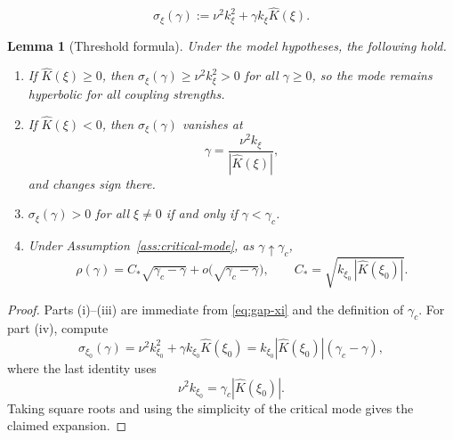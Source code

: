 \documentclass[10pt,a4paper]{amsart}
\newtheorem{lemma}{Lemma}
\newcommand{\Kh}{\widehat{K}}
\newcommand{\gamc}{\gamma_c}
\begin{document}
\begin{equation}
\label{eq:gap-xi}
\sigma_\xi(\gamma) := \nu^2 k_\xi^2+\gamma k_\xi \Kh(\xi).
\end{equation}

\begin{lemma}[Threshold formula]
\label{lem:threshold}
Under the model hypotheses, the following hold.
\begin{enumerate}[label=\textup{(\roman*)},leftmargin=2em]
\item If $\Kh(\xi)\ge 0$, then $\sigma_\xi(\gamma)\ge \nu^2k_\xi^2>0$ for all $\gamma\ge 0$,
so the mode remains hyperbolic for all coupling strengths.
\item If $\Kh(\xi)<0$, then $\sigma_\xi(\gamma)$ vanishes at
\[
\gamma=\frac{\nu^2k_\xi}{|\Kh(\xi)|},
\]
and changes sign there.
\item $\sigma_\xi(\gamma)>0$ for all $\xi\neq 0$ if and only if $\gamma<\gamc$.
\item Under Assumption~\ref{ass:critical-mode}, as $\gamma\uparrow\gamc$,
\[
\rho(\gamma) = C_\ast\sqrt{\gamc-\gamma}+o\!\bigl(\sqrt{\gamc-\gamma}\bigr),
\qquad
C_\ast = \sqrt{k_{\xi_0}\,|\Kh(\xi_0)|}.
\]
\end{enumerate}
\end{lemma}

\begin{proof}
Parts (i)--(iii) are immediate from \eqref{eq:gap-xi} and the definition of $\gamc$.
For part (iv), compute
\[
\sigma_{\xi_0}(\gamma)
= \nu^2k_{\xi_0}^2 + \gamma k_{\xi_0}\Kh(\xi_0)
= k_{\xi_0}|\Kh(\xi_0)|(\gamc - \gamma),
\]
where the last identity uses
\[
\nu^2k_{\xi_0}=\gamc|\Kh(\xi_0)|.
\]
Taking square roots and using the simplicity of the critical mode gives the claimed expansion.
\end{proof}
\end{document}
